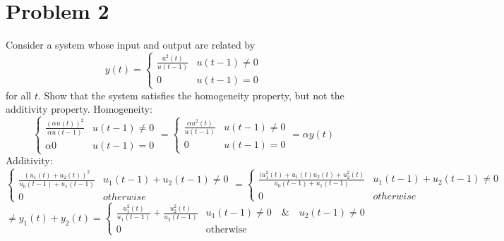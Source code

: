 \documentclass{article}
\begin{document}
\section*{Problem 2}
Consider a system whose input and output are related by
$$y(t) =
 \begin{cases}
    \frac{u^2(t)}{u(t-1)} & u(t-1) \neq 0 \\
    0                     & u(t-1) =  0
\end{cases}
$$
for all $t$.
Show that the system satisfies the homogeneity property, but not the additivity property.
\newline
Homogeneity:
$$
\begin{cases}
    \frac{(\alpha u(t))^2}{\alpha u(t-1)} & u(t-1) \neq 0 \\
    \alpha 0                              & u(t-1) =  0
\end{cases}
=
\begin{cases}
    \frac{\alpha u^2(t)}{u(t-1)} & u(t-1) \neq 0 \\
    0                            & u(t-1) =  0
\end{cases}
=
\alpha y(t)
$$
Additivity:
$$
\begin{cases}
    \frac{(u_1(t)+u_2(t))^2}{u_0(t-1)+u_1(t-1)} & u_1(t-1) + u_2(t-1) \neq 0 \\
    0                                           & otherwise
\end{cases}
=
\begin{cases}
    \frac{(u_1^2(t)+u_1(t)u_2(t) + u_2^2(t)}{u_0(t-1)+u_1(t-1)} & u_1(t-1) + u_2(t-1) \neq 0 \\
    0                                           & otherwise
\end{cases}
$$
$$
\neq
y_1(t) + y_2(t)
=
\begin{cases}
    \frac{u_1^2(t)}{u_1(t-1)} + \frac{u_2^2(t)}{u_2(t-1)}  & u_1(t-1) \neq 0 \quad \& \quad u_2(t-1) \neq 0\\
    0                                                      & \text{otherwise}
\end{cases}
$$

\newpage
\end{document}
